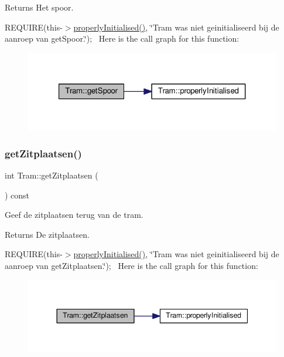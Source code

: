 \begin{DoxyReturn}{Returns}
Het spoor.
\end{DoxyReturn}
R\+E\+Q\+U\+I\+RE(this-\/$>$\hyperlink{class_tram_ac2688f590e4db232b4f535c9bf959efb}{properly\+Initialised()}, \char`\"{}\+Tram was niet geinitialiseerd bij de aanroep van get\+Spoor.\char`\"{});~\newline
Here is the call graph for this function\+:\nopagebreak
\begin{figure}[H]
\begin{center}
\leavevmode
\includegraphics[width=321pt]{class_tram_aee9cf13e0525ac7c769709edf1ff987d_cgraph}
\end{center}
\end{figure}
\mbox{\label{class_tram_abcb1ce0d10e394fce8a99b460e5104de}} 
\subsubsection{\texorpdfstring{get\+Zitplaatsen()}{getZitplaatsen()}}
{\footnotesize\ttfamily int Tram\+::get\+Zitplaatsen (\begin{DoxyParamCaption}{ }\end{DoxyParamCaption}) const}



Geef de zitplaatsen terug van de tram. 

\begin{DoxyReturn}{Returns}
De zitplaatsen.
\end{DoxyReturn}
R\+E\+Q\+U\+I\+RE(this-\/$>$\hyperlink{class_tram_ac2688f590e4db232b4f535c9bf959efb}{properly\+Initialised()}, \char`\"{}\+Tram was niet geinitialiseerd bij de aanroep van get\+Zitplaatsen.\char`\"{});~\newline
Here is the call graph for this function\+:\nopagebreak
\begin{figure}[H]
\begin{center}
\leavevmode
\includegraphics[width=344pt]{class_tram_abcb1ce0d10e394fce8a99b460e5104de_cgraph}
\end{center}
\end{figure}
\mbox{\label{class_tram_ac2688f590e4db232b4f535c9bf959efb}} 
